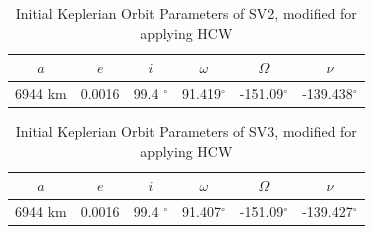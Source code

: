 \begin{table}[h]
\centering
\begin{tabular}{cccccc} \hline
    $a$ & $e$ & $i$ & $\omega$ & $\Omega$ & $\nu$ \\ \hline 
     6944 km & 0.0016 & 99.4 $^\circ$ & 91.419$^\circ$ & -151.09$^\circ$ & -139.438$^\circ$ \\ \hline
\end{tabular}
\caption{Initial Keplerian Orbit Parameters of SV2, modified for applying HCW}
\label{tab:abs_oe_kepler_SV2_HCW}
\end{table}

\begin{table}[h]
\centering
\begin{tabular}{cccccc} \hline
    $a$ & $e$ & $i$ & $\omega$ & $\Omega$ & $\nu$ \\ \hline 
     6944 km & 0.0016 & 99.4 $^\circ$ & 91.407$^\circ$ & -151.09$^\circ$ & -139.427$^\circ$ \\ \hline
\end{tabular}
\caption{Initial Keplerian Orbit Parameters of SV3, modified for applying HCW}
\label{tab:abs_oe_kepler_SV3_HCW}
\end{table}


